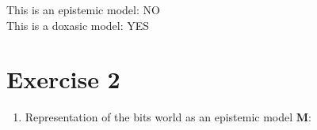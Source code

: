 \documentclass[leqno]{article}
\begin{document}
\begin{enumerate}
    This is an epistemic model: NO \\
    This is a doxasic model: YES \\

\end{enumerate}


\section{Exercise 2}

\begin{enumerate}

    \item Representation of the bits world as an epistemic model \textbf{M}: \\


\end{enumerate}
\end{document}
